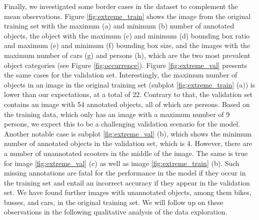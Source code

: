 \documentclass{article}
\begin{document}
Finally, we investigated some border cases in the dataset to complement the mean observations. Figure \ref{fig:extreme_train} shows the image from the original training set with the maximum (a) and minimum (b) number of annotated objects, the object with the maximum (c) and minimum (d) bounding box ratio and maximum (e) and minimum (f) bounding box size, and the images with the maximum number of cars (g) and persons (h), which are the two most prevalent object categories (see Figure \ref{fig:occurrence}). Figure \ref{fig:extreme_val} presents the same cases for the validation set. Interestingly, the maximum number of objects in an image in the original training set (subplot \ref{fig:extreme_train} (a)) is lower than our expectations, at a total of 22. Contrary to that, the validation set contains an image with 54 annotated objects, all of which are persons. Based on the training data, which only has an image with a maximum number of 9 persons, we expect this to be a challenging validation scenario for the model. Another notable case is subplot \ref{fig:extreme_val} (b), which shows the minimum number of annotated objects in the validation set, which is 4. However, there are a number of unannotated scooters in the middle of the image. The same is true for image \ref{fig:extreme_val} (c) as well as image \ref{fig:extreme_train} (b). Such missing annotations are fatal for the performance in the model if they occur in the training set \cite{xu2019missing} and entail an incorrect accuracy if they appear in the validation set. We have found further images with unannotated objects, among them bikes, busses, and cars, in the original training set. We will follow up on these observations in the following qualitative analysis of the data exploration.
\end{document}
